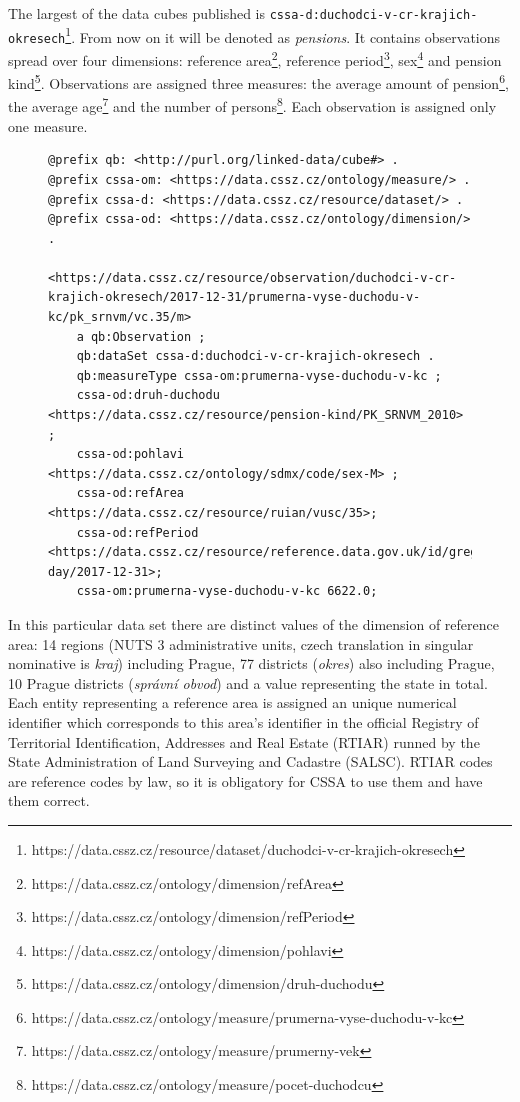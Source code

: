 
The largest of the data cubes published is \verb|cssa-d:duchodci-v-cr-krajich-okresech|\footnote{https://data.cssz.cz/resource/dataset/duchodci-v-cr-krajich-okresech}. From now on it will be denoted as \textit{pensions}. It contains  observations spread over four dimensions: reference area\footnote{https://data.cssz.cz/ontology/dimension/refArea}, reference period\footnote{https://data.cssz.cz/ontology/dimension/refPeriod}, sex\footnote{https://data.cssz.cz/ontology/dimension/pohlavi} and pension kind\footnote{https://data.cssz.cz/ontology/dimension/druh-duchodu}. Observations are assigned three measures: the average amount of pension\footnote{https://data.cssz.cz/ontology/measure/prumerna-vyse-duchodu-v-kc}, the average age\footnote{https://data.cssz.cz/ontology/measure/prumerny-vek} and the number of persons\footnote{https://data.cssz.cz/ontology/measure/pocet-duchodcu}. Each observation is assigned only one measure.

\begin{figure}[h]
\begin{lstlisting}[language = turtle, caption={Example of an observation from \textit{pensions} data set}, label={cssa1example},captionpos=b escapeinside={(*@}{@*)}]
@prefix qb: <http://purl.org/linked-data/cube#> .
@prefix cssa-om: <https://data.cssz.cz/ontology/measure/> .
@prefix cssa-d: <https://data.cssz.cz/resource/dataset/> .
@prefix cssa-od: <https://data.cssz.cz/ontology/dimension/> .

<https://data.cssz.cz/resource/observation/duchodci-v-cr-krajich-okresech/2017-12-31/prumerna-vyse-duchodu-v-kc/pk_srnvm/vc.35/m>
    a qb:Observation ;
    qb:dataSet cssa-d:duchodci-v-cr-krajich-okresech .
    qb:measureType cssa-om:prumerna-vyse-duchodu-v-kc ;
    cssa-od:druh-duchodu <https://data.cssz.cz/resource/pension-kind/PK_SRNVM_2010> ;
    cssa-od:pohlavi <https://data.cssz.cz/ontology/sdmx/code/sex-M> ;
    cssa-od:refArea <https://data.cssz.cz/resource/ruian/vusc/35>;
    cssa-od:refPeriod <https://data.cssz.cz/resource/reference.data.gov.uk/id/gregorian-day/2017-12-31>;
    cssa-om:prumerna-vyse-duchodu-v-kc 6622.0;
\end{lstlisting}
\end{figure}

In this particular data set there are  distinct values of the dimension of reference area: 14 regions (NUTS 3 administrative units, czech translation in singular nominative is \textit{kraj}) including Prague, 77 districts (\textit{okres}) also including Prague, 10 Prague districts (\textit{správní obvod}) and a value representing the state in total. Each entity representing a reference area is assigned an unique numerical identifier which corresponds to this area's identifier in the official Registry of Territorial Identification, Addresses and Real Estate (RTIAR) runned by the State Administration of Land Surveying and Cadastre (SALSC). RTIAR codes are reference codes by law, so it is obligatory for CSSA to use them and have them correct.


